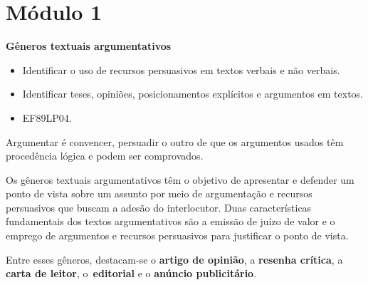
\section{Módulo 1}

\textbf{Gêneros textuais argumentativos}


\begin{itemize}
\tightlist
\item
  Identificar o uso de recursos persuasivos em textos verbais e não
  verbais.
\item
  Identificar teses, opiniões, posicionamentos explícitos e argumentos
  em textos.
\end{itemize}


\begin{itemize}
\tightlist
\item
  EF89LP04.
\end{itemize}

Argumentar é convencer, persuadir o outro de que os argumentos usados
têm procedência lógica e podem ser comprovados.

Os gêneros textuais argumentativos têm o objetivo de apresentar e
defender um ponto de vista sobre um assunto por meio de argumentação e
recursos persuasivos que buscam a adesão do interlocutor. Duas
características fundamentais dos textos argumentativos são a emissão de
juízo de valor e o emprego de argumentos e recursos persuasivos para
justificar o ponto de vista.

Entre esses gêneros, destacam-se o \textbf{artigo de opinião}, a
\textbf{resenha crítica}, a \textbf{carta de leitor},
o~\textbf{editorial} e o \textbf{anúncio publicitário}.


